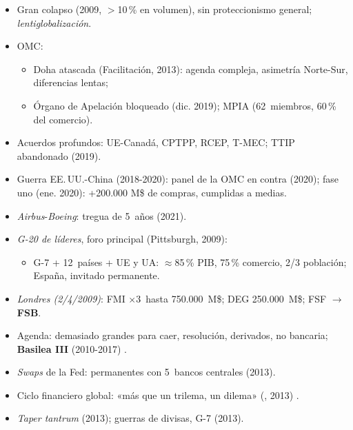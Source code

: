 \documentclass{article}
\begin{document}
\begin{columnas}
\begin{itemize}
\item Gran colapso (2009, $>$10\,\% en volumen), sin proteccionismo general; \emph{lentiglobalización}.
\item OMC:
  \begin{itemize}
  \item Doha atascada (Facilitación, 2013): agenda compleja, asimetría Norte-Sur, diferencias lentas;
  \item Órgano de Apelación bloqueado (dic. 2019); MPIA (62~miembros, 60\,\% del comercio).
  \end{itemize}
\item Acuerdos profundos: UE-Canadá, CPTPP, RCEP, T-MEC; TTIP abandonado (2019).
\item Guerra EE.\,UU.-China (2018-2020): panel de la OMC en contra (2020); fase uno (ene. 2020): +200.000 M\$ de compras, cumplidas a medias.
\item \emph{Airbus}-\emph{Boeing}: tregua de 5~años (2021).
\end{itemize}
\begin{itemize}
\item \emph{G-20 de líderes}, foro principal (Pittsburgh, 2009):
  \begin{itemize}
  \item G-7 + 12~países + UE y UA: $\approx$85\,\% PIB, 75\,\% comercio, 2/3 población; España, invitado permanente.
  \end{itemize}
\item \emph{Londres (2/4/2009)}: FMI $\times$3~hasta 750.000~M\$; DEG 250.000~M\$; FSF $\to$ \textbf{FSB}.
\item Agenda: demasiado grandes para caer, resolución, derivados, no bancaria; \textbf{Basilea III} (2010-2017) .
\end{itemize}
\begin{itemize}
\item \emph{Swaps} de la Fed: permanentes con 5~bancos centrales (2013).
\item Ciclo financiero global: «más que un trilema, un dilema» (, 2013) .
\item \emph{Taper tantrum} (2013); guerras de divisas, G-7 (2013).
\end{itemize}


\end{columnas}
\end{document}
